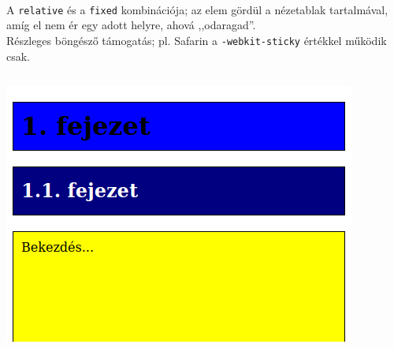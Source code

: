 \begin{frame}
  \begin{columns}[T]
      \begin{exampleblock}{}
        \scriptsize
        
      \end{exampleblock}
      \begin{exampleblock}{}
        \scriptsize
        
      \end{exampleblock}
  \end{columns}  
\end{frame}

\begin{frame}
  \begin{description}[m]
    \item[\texttt{sticky}] \hfill \\ A \texttt{relative} és a \texttt{fixed} kombinációja; az elem gördül a nézetablak tartalmával, amíg el nem ér egy adott helyre, ahová ,,odaragad''.\\
    \vspace{0.3cm} \tiny Részleges böngésző támogatás; pl. Safarin a \texttt{-webkit-sticky} értékkel működik csak.
  \end{description}
  \begin{columns}[T]
      \includegraphics[width=\textwidth]{sticky1.png}

\end{columns}
\end{frame}
